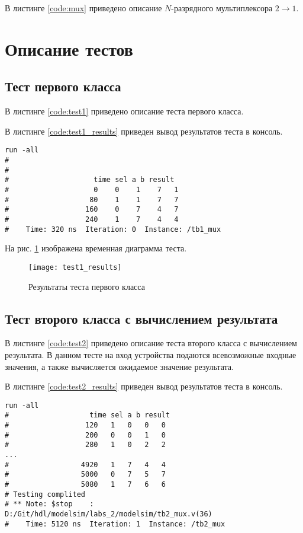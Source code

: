 В листинге \ref{code:mux} приведено описание $N$-разрядного мультиплексора $2 \rightarrow 1$.


\section{Описание тестов}
\label{sec:tests}

\subsection{Тест первого класса}

В листинге \ref{code:test1} приведено описание теста первого класса.


В листинге \ref{code:test1_results} приведен вывод результатов теста в консоль.
\begin{lstlisting}[caption=Результаты теста первого класса, label=code:test1_results, style=console]
run -all
# 
# 
# 		             time sel a b result
#                    0    0    1    7   1
#                   80    1    1    7   7
#                  160    0    7    4   7
#                  240    1    7    4   4
#    Time: 320 ns  Iteration: 0  Instance: /tb1_mux
\end{lstlisting}

На рис. \ref{fig:test1_results} изображена временная диаграмма теста.
\begin{figure}[H]
	\begin{center}
		\texttt{[image: test1\_results]}
		\caption{Результаты теста первого класса}
		\label{fig:test1_results}
	\end{center}
\end{figure}
\vspace{-1.5cm}

\subsection{Тест второго класса с вычислением результата}

В листинге \ref{code:test2} приведено описание теста второго класса с вычислением результата. В данном тесте на вход устройства подаются всевозможные входные значения, а также вычисляется ожидаемое значение результата. 


В листинге \ref{code:test2_results} приведен вывод результатов теста в консоль.
\begin{lstlisting}[caption=Результаты теста второго класса с вычислением результата, label=code:test2_results, style=console]
run -all
# 		            time sel a b result
#                  120   1   0   0   0
#                  200   0   0   1   0
#                  280   1   0   2   2
...
#                 4920   1   7   4   4
#                 5000   0   7   5   7
#                 5080   1   7   6   6
# Testing complited
# ** Note: $stop    : D:/Git/hdl/modelsim/labs_2/modelsim/tb2_mux.v(36)
#    Time: 5120 ns  Iteration: 1  Instance: /tb2_mux
\end{lstlisting}

